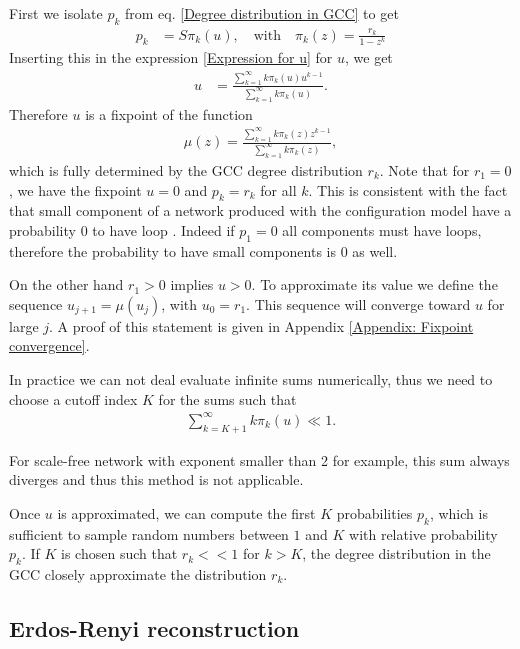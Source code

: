 \documentclass[
11pt, %
english, %
singlespacing, %
liststotoc, %
headsepline, %
]{MastersDoctoralThesis} %
\begin{document}
First we isolate $p_k$ from eq. \eqref{Degree distribution in GCC} to get
\begin{align}
	p_k &= S \pi_k(u), \quad \text{with} \quad \pi_k(z) = \frac{r_k}{1 - z^k}
\end{align}
Inserting this in the expression \eqref{Expression for u} for $u$, we get
\begin{align}
	u &= \frac{\sum_{k=1}^\infty k \pi_k(u) u^{k-1}}{\sum_{k=1}^\infty k \pi_k(u)}. \label{Fixpoint equation for u}
\end{align}
Therefore $u$ is a fixpoint of the function
\begin{align}
	\mu(z) = \frac{\sum_{k=1}^\infty k \pi_k(z) z^{k-1}}{\sum_{k=1}^\infty k \pi_k(z)}, \label{Defition of mu}
\end{align}
which is fully determined by the GCC degree distribution $r_k$. Note that for $r_1 = 0$, we have the fixpoint $u = 0$ and $p_k = r_k$ for all $k$. This is consistent with the fact that small component of a network produced with the configuration model have a probability $0$ to have loop \cite{newman2010networks}. Indeed if $p_1 = 0$ all components must have loops, therefore the probability to have small components is $0$ as well.

On the other hand $r_1 > 0$ implies $u > 0$. To approximate its value we define the sequence $u_{j+1} = \mu(u_j)$, with $u_0 = r_1$. This sequence will converge toward $u$ for large $j$. A proof of this statement is given in Appendix \ref{Appendix: Fixpoint convergence}.

In practice we can not deal evaluate infinite sums numerically, thus we need to choose a cutoff index $K$ for the sums such that
\begin{align}
	\sum_{k=K+1}^\infty k \pi_k(u) \ll 1.
\end{align}

For scale-free network with exponent smaller than 2 for example, this sum always diverges and thus this method is not applicable.

Once $u$ is approximated, we can compute the first $K$ probabilities $p_k$, which is sufficient to sample random numbers between $1$ and $K$ with relative probability $p_k$. If $K$ is chosen such that $r_k << 1$ for $k > K$, the degree distribution in the GCC closely approximate the distribution $r_k$.

\subsection{Erdos-Renyi reconstruction}
\end{document}
